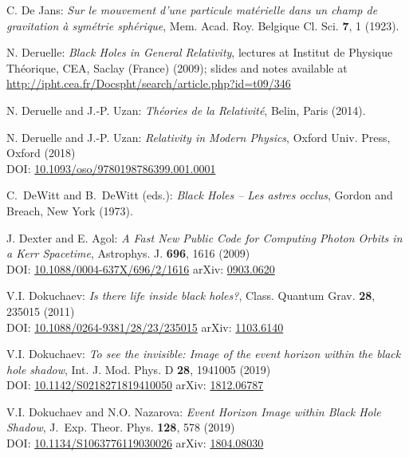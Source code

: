 \begin{thebibliography}{123}
C. De Jans:
\emph{Sur le mouvement d'une particule matérielle dans un champ de gravitation à symétrie sphérique},
Mem. Acad. Roy. Belgique Cl. Sci. {\bf 7}, 1 (1923).

N. Deruelle: {\em Black Holes in General Relativity}, lectures at
Institut de Physique Théorique, CEA, Saclay (France) (2009); slides and notes
available at \\
\url{http://ipht.cea.fr/Docspht/search/article.php?id=t09/346}

N. Deruelle and J.-P. Uzan: {\em Th\'eories de la Relativit\'e},
Belin, Paris (2014).

N. Deruelle and J.-P. Uzan: {\em Relativity in Modern Physics},
Oxford Univ. Press, Oxford (2018)\\
DOI: \href{https://doi.org/10.1093/oso/9780198786399.001.0001}{10.1093/oso/9780198786399.001.0001}

C.~DeWitt and B.~DeWitt (eds.):
{\em Black Holes -- Les astres occlus},
Gordon and Breach, New York (1973).

J. Dexter and E. Agol:
{\em A Fast New Public Code for Computing Photon Orbits in a Kerr Spacetime},
Astrophys. J. {\bf 696}, 1616 (2009)\\
DOI: \href{https://doi.org/10.1088/0004-637X/696/2/1616}{10.1088/0004-637X/696/2/1616}\hfill
arXiv: \href{https://arxiv.org/abs/0903.0620}{0903.0620}

V.I. Dokuchaev: {\em Is there life inside black holes?},
Class. Quantum Grav. {\bf 28}, 235015 (2011)\\
DOI: \href{https://doi.org/10.1088/0264-9381/28/23/235015}{10.1088/0264-9381/28/23/235015}\hfill
arXiv: \href{https://arxiv.org/abs/1103.6140}{1103.6140}

V.I. Dokuchaev: {\em To see the invisible: Image of the event horizon within the black hole shadow},
Int. J. Mod. Phys. D {\bf 28}, 1941005 (2019)\\
DOI: \href{https://doi.org/10.1142/S0218271819410050}{10.1142/S0218271819410050}\hfill
arXiv: \href{https://arxiv.org/abs/1812.06787}{1812.06787}

V.I. Dokuchaev and N.O. Nazarova: {\em Event Horizon Image within Black Hole Shadow},
J.~Exp. Theor. Phys. {\bf 128}, 578 (2019)\\
DOI: \href{https://doi.org/10.1134/S1063776119030026}{10.1134/S1063776119030026}\hfill
arXiv: \href{https://arxiv.org/abs/1804.08030}{1804.08030}


\end{thebibliography}

